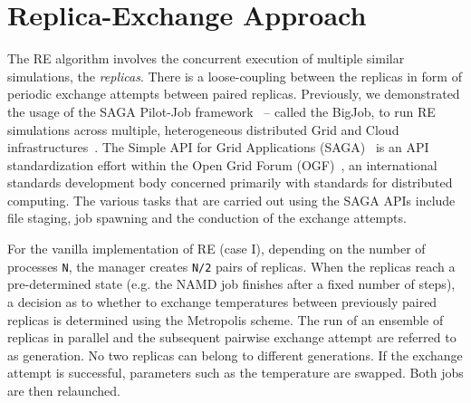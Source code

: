 \documentclass[a4paper,10pt]{article}
\newcommand{\jhanote}[1]{ {\textcolor{red} { ***shantenu: #1 }}}
\newcommand{\alnote}[1]{ {\textcolor{blue} { ***andre: #1 }}}
\newcommand{\athotanote}[1]{ {\textcolor{green} { ***athota: #1 }}}
\newcommand{\alnote}[1]{}
\newcommand{\jhanote}[1]{}
\newcommand{\athotanote}[1]{}
\begin{document}

\section{Replica-Exchange Approach}

The RE algorithm involves the concurrent execution of multiple similar
simulations, the \emph{replicas}.  There is a loose-coupling between
the replicas in form of periodic exchange attempts between paired
replicas. Previously, we demonstrated the usage of the SAGA Pilot-Job
framework~\cite{saga_bigjob_condor_cloud} -- called the BigJob, to run
RE simulations across multiple, heterogeneous
distributed Grid and Cloud infrastructures~\cite{Luckow:2008fp}.
The Simple API for Grid Applications (SAGA)~\cite{saga_gfd90} is an
API standardization effort within the Open Grid Forum
(OGF)~\cite{ogf_web}, an international standards development body
concerned primarily with standards for distributed computing.
The various tasks that are carried out using the SAGA APIs include file staging, job
spawning and the conduction of the exchange attempts.


For the vanilla implementation of RE (case I), depending
on the number of processes \texttt{N}, the manager creates \texttt{N/2} pairs
of replicas. When the replicas reach a
pre-determined state (e.g. the NAMD job finishes after a fixed number
of steps), a decision as to whether to exchange temperatures between
previously paired replicas is determined using the Metropolis scheme.
The run of an ensemble of replicas in parallel and the subsequent
pairwise exchange attempt are referred to as generation. No two
replicas can belong to different generations. If the exchange attempt
is successful, parameters such as the temperature are swapped. Both
jobs are then relaunched. %
 
\end{document}
